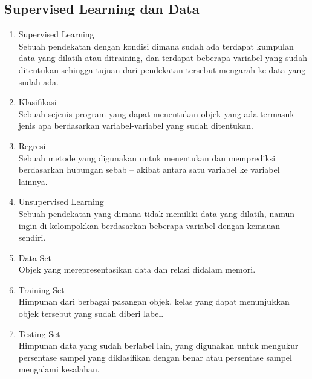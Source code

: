 \subsection{Supervised Learning dan Data}
\begin{enumerate}
	\item Supervised Learning\\
	Sebuah pendekatan dengan kondisi dimana sudah ada terdapat kumpulan data yang dilatih atau ditraining, dan terdapat beberapa variabel yang sudah ditentukan sehingga tujuan dari pendekatan tersebut mengarah ke data yang sudah ada.
	
	\item Klasifikasi\\
	Sebuah sejenis program yang dapat menentukan objek yang ada termasuk jenis apa berdasarkan variabel-variabel yang sudah ditentukan.
	
	\item Regresi\\
	Sebuah metode yang digunakan untuk menentukan dan memprediksi berdasarkan hubungan sebab – akibat antara satu variabel ke variabel lainnya.
	
	\item Unsupervised Learning\\
	Sebuah pendekatan yang dimana tidak memiliki data yang dilatih, namun ingin di kelompokkan berdasarkan beberapa variabel dengan kemauan sendiri.
	
	\item Data Set\\
	Objek yang merepresentasikan data dan relasi didalam memori.

	\item Training Set\\
	Himpunan dari berbagai pasangan objek, kelas yang dapat menunjukkan objek tersebut yang sudah diberi label.

	\item Testing Set\\
	Himpunan data yang sudah berlabel lain, yang digunakan untuk mengukur persentase sampel yang diklasifikan dengan benar atau persentase sampel mengalami kesalahan.

\end{enumerate}

